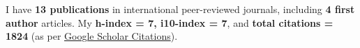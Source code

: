 \hfill
\par
I have \textbf{13 publications} in international peer-reviewed journals, including \textbf{4 first author} articles. My \textbf{h-index = 7, i10-index = 7}, and \textbf{total citations = 1824} (as per \href{https://scholar.google.com/citations?hl=en&user=6-7FYjIAAAAJ&authuser=2}{Google Scholar Citations}).

\nocite{*}


\printbibliography[heading={none},title={Journal Articles},type=article]



